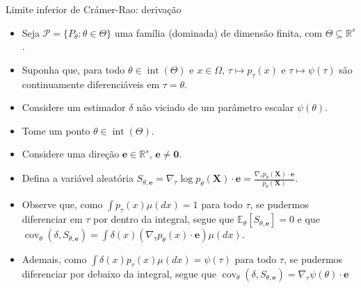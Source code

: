 \documentclass[11pt]{beamer}
\begin{document}
	\begin{frame}{Limite inferior de Crámer-Rao: derivação}
		\begin{itemize}
				\item Seja $\mathcal{P} = \{P_\theta : \theta  \in \Theta\}$ uma família (dominada) de dimensão finita, com $\Theta \subseteq \mathbb{R}^s$.
				\item Suponha que, para todo $\theta \in \operatorname{int}(\Theta)$ e $x \in \Omega$, $\tau \mapsto p_\tau(x)$ e $\tau \mapsto \psi(\tau)$ são continuamente diferenciáveis em $\tau = \theta$.
			\item Considere um estimador $\delta$ não viciado de um parâmetro escalar $\psi(\theta)$.
			\item Tome um ponto $\theta \in \operatorname{int}(\Theta)$.
			
			\item Considere uma direção $\boldsymbol{e} \in \mathbb{R}^s$, $\boldsymbol{e} \neq \boldsymbol{0}$.
			\item Defina a variável aleatória $S_{\theta,\boldsymbol{e}} = \nabla_\tau \log p_{\theta}(\boldsymbol{X})\cdot \boldsymbol{e} =  \frac{\nabla_{\tau} p_{\theta}(\boldsymbol{X}) \cdot \boldsymbol{e}}{p_{\theta}(\boldsymbol{X})}$.
				\item Observe que, como $\int p_{\tau}(x)\mu(dx)=1$ para todo $\tau$, se pudermos diferenciar em $\tau$ por dentro da integral, segue que $\mathbb{E}_{\theta}[S_{\theta,\boldsymbol{e}}] = 0$ e que $\operatorname{cov}_{\theta}(\delta, S_{\theta,\boldsymbol{e}}) = \int\delta(x)  (\nabla_{\tau} p_{\theta}(x) \cdot \boldsymbol{e})  \mu(dx)$.
				\item Ademais, como $\int \delta(x) p_\tau(x) \mu(dx) =\psi(\tau) $ para todo $\tau$, se pudermos diferenciar por debaixo da integral, segue que $   \operatorname{cov}_{\theta}(\delta, S_{\theta,\boldsymbol{e}}) =\nabla_{\tau}\psi(\theta) \cdot \boldsymbol{e}$
			
		\end{itemize}

		
	
		
	\end{frame}
	
\end{document}
